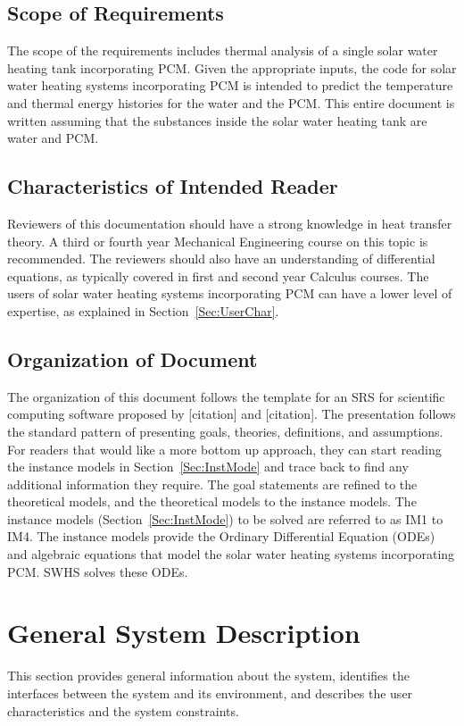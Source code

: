 \documentclass[12pt]{article}
\begin{document}
\subsection{Scope of Requirements}
\label{Sec:ScopofRequ}
The scope of the requirements includes thermal analysis of a single solar water heating tank incorporating PCM. Given the appropriate inputs, the code for solar water heating systems incorporating PCM is intended to predict the temperature and thermal energy histories for the water and the PCM. This entire document is written assuming that the substances inside the solar water heating tank are water and PCM.
\subsection{Characteristics of Intended Reader}
\label{Sec:CharofInteRead}
Reviewers of this documentation should have a strong knowledge in heat transfer theory. A third or fourth year Mechanical Engineering course on this topic is recommended. The reviewers should also have an understanding of differential equations, as typically covered in first and second year Calculus courses. The users of solar water heating systems incorporating PCM can have a lower level of expertise, as explained in Section~\ref{Sec:UserChar}.
\subsection{Organization of Document}
\label{Sec:OrgaofDocu}
The organization of this document follows the template for an SRS for scientific computing software proposed by [citation] and [citation]. The presentation follows the standard pattern of presenting goals, theories, definitions, and assumptions. For readers that would like a more bottom up approach, they can start reading the instance models in Section~\ref{Sec:InstMode} and trace back to find any additional information they require.
The goal statements are refined to the theoretical models, and the theoretical models to the instance models. The instance models (Section~\ref{Sec:InstMode}) to be solved are referred to as IM1 to IM4. The instance models provide the Ordinary Differential Equation (ODEs) and algebraic equations that model the solar water heating systems incorporating PCM. SWHS solves these ODEs.
\section{General System Description}
\label{Sec:GeneSystDesc}
This section provides general information about the system, identifies the interfaces between the system and its environment, and describes the user characteristics and the system constraints.
\end{document}
